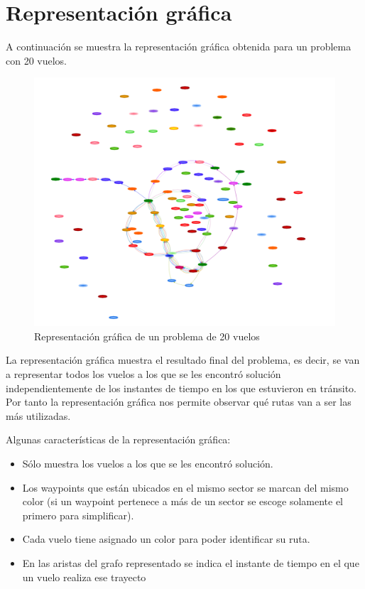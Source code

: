 \section{Representación gráfica}
A continuación se muestra la representación gráfica obtenida para un problema con 20 vuelos.
\begin{figure}[H]
	\begin{center}
		\centering
		\includegraphics[width=1\textwidth]{./imagenes/resultados/resumenRepresentaion.png}
		\caption{Representación gráfica de un problema de 20 vuelos}
		\label{fig: Representación gráfica de un problema de 20 vuelos}
	\end{center}
\end{figure}

La representación gráfica muestra el resultado final del problema, es decir, se van a representar todos los vuelos a los que se les encontró solución independientemente de los instantes de tiempo en los que estuvieron en tránsito. Por tanto la representación gráfica nos permite observar qué rutas van a ser las más utilizadas.

Algunas características de la representación gráfica:
\begin{itemize}
	\item Sólo muestra los vuelos a los que se les encontró solución.
	\item Los waypoints que están ubicados en el mismo sector se marcan del mismo color (si un waypoint pertenece a más de un sector se escoge solamente el primero para simplificar).
	\item Cada vuelo tiene asignado un color para poder identificar su ruta.
	\item En las aristas del grafo representado se indica el instante de tiempo en el que un vuelo realiza ese trayecto
\end{itemize}

